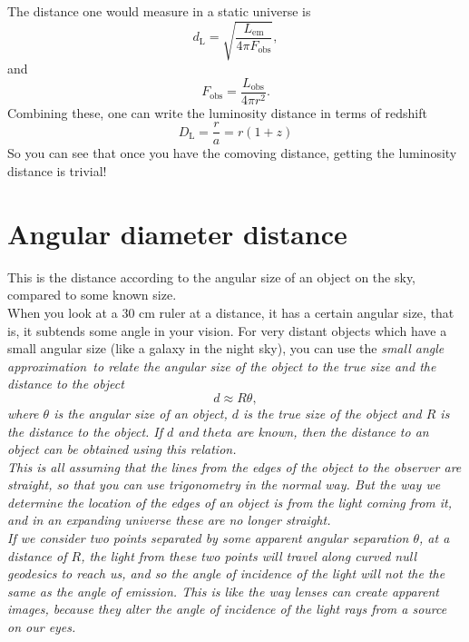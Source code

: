 \documentclass[]{article}
\begin{document}
\noindent The distance one would measure in a static universe is
\begin{equation}
d_\mathrm{L} = \sqrt{\frac{L_\mathrm{em}}{4\pi F_\mathrm{obs}}},
\end{equation}
and 
\begin{equation}
F_\mathrm{obs} = \frac{L_\mathrm{obs}}{4\pi r^2}.
\end{equation}
Combining these, one can write the luminosity distance in terms of redshift
\begin{equation}
D_\mathrm{L} = \frac{r}{a} = r (1+z)
\end{equation}
So you can see that once you have the comoving distance, getting the luminosity distance is trivial!

\section{Angular diameter distance}
This is the distance according to the angular size of an object on the sky, compared to some known size.\\ 

\noindent When you look at a 30 cm ruler at a distance, it has a certain angular size, that is, it subtends some angle in your vision. For very distant objects which have a small angular size (like a galaxy in the night sky), you can use the \itshape small angle approximation~\upshape to relate the angular size of the object to the true size and the distance to the object
\begin{equation}
d \approx R \theta,
\end{equation}
where $\theta$ is the angular size of an object, $d$ is the true size of the object and $R$ is the distance to the object. If $d$ and $theta$ are known, then the distance to an object can be obtained using this relation. \\

\noindent This is all assuming that the lines from the edges of the object to the observer are straight, so that you can use trigonometry in the normal way. But the way we determine the location of the edges of an object is from the light coming from it, and in an expanding universe these are no longer straight. \\

\noindent If we consider two points separated by some apparent angular separation $\theta$, at a distance of $R$, the light from these two points will travel along curved null geodesics to reach us, and so the angle of incidence of the light will not the the same as the angle of emission. This is like the way lenses can create apparent images, because they alter the angle of incidence of the light rays from a source on our eyes. \\
\end{document}
